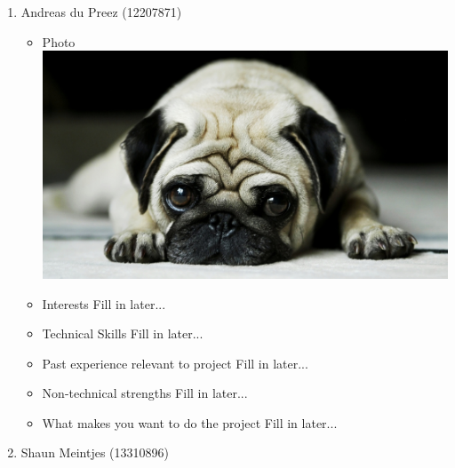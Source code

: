 \documentclass[12pt, oneside]{article}
\begin{document}
\begin{enumerate}
\begin{itemize}
						\end{itemize}
		\item {Andreas du Preez (12207871)\par}
		\begin{itemize}
			\item Photo\newline
				\includegraphics[scale=0.1]{example} %
			\item Interests\newline
				Fill in later...
			\item Technical Skills\newline
				Fill in later...
			\item Past experience relevant to project\newline
				Fill in later...
			\item Non-technical strengths\newline
				Fill in later...
			\item What makes you want to do the project\newline
				Fill in later...
		\end{itemize}
		\item {Shaun Meintjes (13310896)\par}
		\begin{itemize}

\end{itemize}
\end{enumerate}
\end{document}
